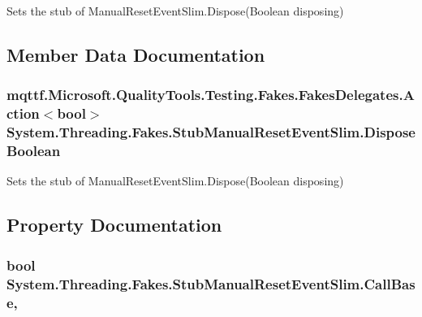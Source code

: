 Sets the stub of Manual\-Reset\-Event\-Slim.\-Dispose(\-Boolean disposing)



\subsection{Member Data Documentation}
\hypertarget{class_system_1_1_threading_1_1_fakes_1_1_stub_manual_reset_event_slim_a32cfca2e7b5e31679fec28d1860c3426}{
\subsubsection[{Dispose\-Boolean}]{\setlength{\rightskip}{0pt plus 5cm}mqttf.\-Microsoft.\-Quality\-Tools.\-Testing.\-Fakes.\-Fakes\-Delegates.\-Action$<$bool$>$ System.\-Threading.\-Fakes.\-Stub\-Manual\-Reset\-Event\-Slim.\-Dispose\-Boolean}}\label{class_system_1_1_threading_1_1_fakes_1_1_stub_manual_reset_event_slim_a32cfca2e7b5e31679fec28d1860c3426}


Sets the stub of Manual\-Reset\-Event\-Slim.\-Dispose(\-Boolean disposing)



\subsection{Property Documentation}
\hypertarget{class_system_1_1_threading_1_1_fakes_1_1_stub_manual_reset_event_slim_a001d97b9d2ddd03a1e4f9caac904be93}{
\subsubsection[{Call\-Base}]{\setlength{\rightskip}{0pt plus 5cm}bool System.\-Threading.\-Fakes.\-Stub\-Manual\-Reset\-Event\-Slim.\-Call\-Base\hspace{0.3cm}{\ttfamily [get]}, {\ttfamily [set]}}}\label{class_system_1_1_threading_1_1_fakes_1_1_stub_manual_reset_event_slim_a001d97b9d2ddd03a1e4f9caac904be93}


